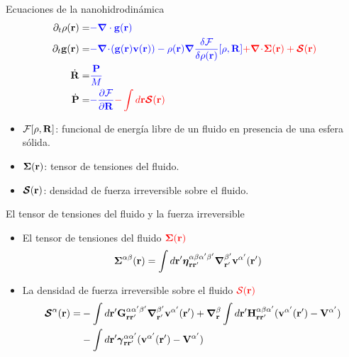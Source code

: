 \documentclass{beamer}
\newcommand{\esc}{\!\cdot\!}
\begin{document}
\begin{frame}{Ecuaciones de la nanohidrodinámica}
\begin{align}
  \partial_t\rho({\bf r})=&{\color{blue} -\boldsymbol{\nabla}\cdot{\bf g}({\bf r})}
\nonumber\\
\partial_t{\bf g}({\bf r})=&{\color{blue} -\boldsymbol{\nabla}\esc{\left({\bf g}({\bf r}){\bf v}({\bf r})\right)}
-\rho({\bf r})\boldsymbol{\nabla}\frac{\delta {\cal F}}{\delta\rho({\bf r})}[\rho,{\bf R}]}
{\color{red} +\boldsymbol{\nabla}\esc\boldsymbol{\Sigma}({\bf r})+\boldsymbol{{\cal S}}({\bf r})}
\nonumber\\
\dot{\bf R}=&{\color{blue} \frac{\bf P}{M}}
\nonumber\\
\dot{\bf P}=&{\color{blue} -\frac{\partial {\cal F}}{\partial {\bf R}}}
{\color{red} -\int d {{\bf r}}\boldsymbol{{\cal S}}({\bf r})}
\nonumber
\end{align}

\begin{itemize}
  \item ${\cal F}[\rho, {\bf R}]$: funcional de energía libre de un fluido en presencia de una esfera sólida. 
  \item $\boldsymbol{\Sigma}({\bf r})$: tensor de tensiones del fluido. 
  \item $\boldsymbol{{\cal S}}({\bf r})$: densidad de fuerza irreversible sobre el fluido. 
\end{itemize}
\end{frame}

\begin{frame}{El tensor de tensiones del fluido y la fuerza irreversible}
  \begin{itemize}
    \item<1-> El tensor de tensiones del fluido ${\color{red} \boldsymbol{\Sigma}({\bf r})}$ 
  \begin{align}
  \boldsymbol{\Sigma}^{\alpha\beta}({\bf r})&=
\int d{\bf r}'
\boldsymbol{\eta}^{\alpha\beta\alpha'\beta'}_{{\bf r}{\bf r}'}
\boldsymbol{\nabla}_{{\bf r}'}^{\beta'}{\bf v}^{\alpha'}({\bf r}')
\nonumber
\end{align}
\item<2-> La densidad de fuerza irreversible sobre el fluido ${\color{red} {\cal S}({\bf r})}$
\begin{align}
  \boldsymbol{{\cal S}}^\alpha({\bf r})=&
-\int d{\bf r}'{\bf G}^{\alpha\alpha'\beta'}_{{\bf r}{\bf r}'}
\boldsymbol{\nabla}_{{\bf r}'}^{\beta'} {\bf v}^{\alpha'}({\bf r}')
+\boldsymbol{\nabla}_{{\bf r}}^{\beta}\int d{\bf r}'{\bf H}^{\alpha\beta\alpha'}_{{\bf r}{\bf r}'}
( {\bf v}^{\alpha'}({\bf r}')-{\bf V}^{\alpha'})
\nonumber\\
&-\int d{\bf r}'
\boldsymbol{\gamma}^{\alpha\alpha'}_{{\bf r}{\bf r}'}( {\bf v}^{\alpha'}({\bf r}')
-{\bf V}^{\alpha'})
\nonumber
\end{align}
\end{itemize}
\end{frame}
\end{document}
